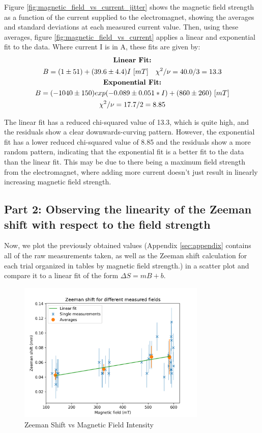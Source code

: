 Figure \ref{fig:magnetic_field_vs_current_jitter} shows the magnetic field strength as a function of the current supplied to the electromagnet, showing the averages and standard deviations at each measured current value. Then, using these averages, figure \ref{fig:magnetic_field_vs_current} applies a linear and exponential fit to the data. Where current I is in A, these fits are given by:
\begin{gather*}
    \text{\textbf{Linear Fit:}} \\
    B = (1 \pm 51) + (39.6 \pm 4.4)I~[mT] \quad \chi^2 / \nu = 40.0 / 3 = 13.3 \\
    \text{\textbf{Exponential Fit:}} \\
    B = (-1040 \pm 150) exp (-0.089 \pm 0.051 * I) + (860 \pm 260)~[mT] \\
    \chi^2 / \nu = 17.7 / 2 = 8.85
\end{gather*}


The linear fit has a reduced chi-squared value of 13.3, which is quite high, and the residuals show a clear downwards-curving pattern. However, the exponential fit has a lower reduced chi-squared value of 8.85 and the residuals show a more random pattern, indicating that the exponential fit is a better fit to the data than the linear fit. This may be due to there being a maximum field strength from the electromagnet, where adding more current doesn't just result in linearly increasing magnetic field strength.

\subsection{Part 2: Observing the linearity of the Zeeman shift with respect to the field strength}

Now, we plot the previously obtained values (Appendix \ref{sec:appendix} contains all of the raw measurements taken, as well as the Zeeman shift calculation for each trial organized in tables by magnetic field strength.)
in a scatter plot and compare it to a linear fit of the form $\Delta S = mB + b$.

\begin{figure}
    \centering
    \includegraphics[width=0.8\textwidth]{Results/img/zeeman_shift_scatter.png}
    \caption{Zeeman Shift vs Magnetic Field Intensity}
    \label{fig:zeeman_shift_scatter}
\end{figure}

